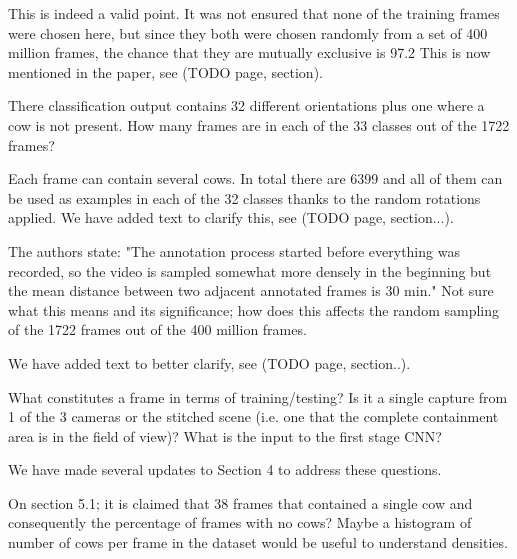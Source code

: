 \documentclass[10pt,a4paper]{letter}
\begin{document}
\begin{letter}{}
This is indeed a valid point. It was not ensured that none of the training frames were chosen here, but
since they both were chosen randomly from a set of 400 million frames, the
chance that they are mutually exclusive is 97.2%
This is now mentioned in the paper, see (TODO page, section).

\begin{siderules}
There classification output contains 32 different orientations plus one where a cow is not present. How many frames are in each of the 33 classes 
out of the 1722 frames?
\end{siderules}

Each frame can contain several cows. In total there are 6399 and all of them
can be used as examples in each of the 32 classes thanks to the random
rotations applied. We have added text to clarify this, see (TODO page, section...).

\begin{siderules}
The authors state: "The annotation process started before everything was recorded, so the video is sampled somewhat more densely in the beginning but 
the mean distance between two adjacent annotated frames is 30 min." Not sure what this means and its significance; how does this affects the random 
sampling of the 1722 frames out of the 400 million frames.
\end{siderules}

We have added text to better clarify, see (TODO page, section..).

\begin{siderules}
What constitutes a frame in terms of training/testing? Is it a single capture from 1 of the 3 cameras or the stitched scene (i.e. one that the complete 
containment area is in the field of view)? What is the input to the first stage CNN?
\end{siderules}

We have made several updates to Section 4 to address these questions.

\begin{siderules}
On section 5.1; it is claimed that 38%
frames that contained a single cow and consequently the percentage of frames with no cows? Maybe a histogram of number of cows per frame in the dataset 
would be useful to understand densities. 
\end{siderules}


\end{letter}
\end{document}
